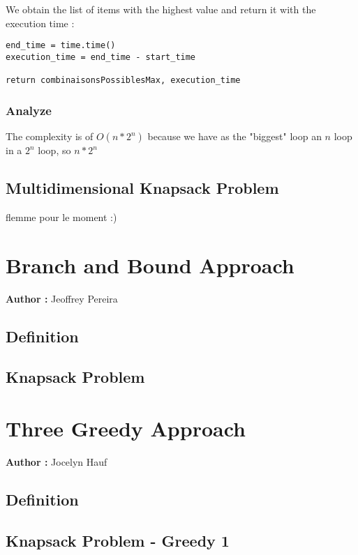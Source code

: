 \documentclass[12pt]{article}
\begin{document}
            \newpage We obtain the list of items with the highest value and return it with the execution time :

            \begin{lstlisting}
end_time = time.time()
execution_time = end_time - start_time
    
return combinaisonsPossiblesMax, execution_time
            \end{lstlisting}
            
        \subsubsection{Analyze}

            The complexity is of $O(n*2^n)$ because we have as the "biggest" loop an $n$ loop in a $2^n$ loop, so $n*2^n$
    
    \subsection{Multidimensional Knapsack Problem}

        flemme pour le moment :)

\section{Branch and Bound Approach}

    \textbf{Author :} Jeoffrey Pereira

    \subsection{Definition}
    
    \subsection{Knapsack Problem}

\section{Three Greedy Approach}

    \textbf{Author :} Jocelyn Hauf

    \subsection{Definition}
    
    \subsection{Knapsack Problem - Greedy 1}
    
\end{document}
